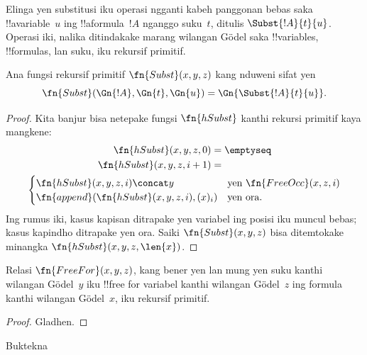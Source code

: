 \documentclass[../../../include/open-logic-section]{subfiles}
\begin{document}

Elinga yen substitusi iku operasi ngganti kabeh panggonan bebas
saka !!a{variable}~$u$ ing !!a{formula}~$!A$ nganggo suku~$t$,
ditulis $\Subst{!A}{t}{u}$. Operasi iki, nalika ditindakake marang
wilangan G\"odel saka !!{variable}s, !!{formula}s, lan suku,
iku rekursif primitif.

\begin{prop}
Ana fungsi rekursif primitif $\fn{Subst}(x, y, z)$ kang nduweni
sifat yen
\[
\fn{Subst}(\Gn{!A}, \Gn{t}, \Gn{u}) = \Gn{\Subst{!A}{t}{u}}.
\]
\end{prop}

\begin{proof}
Kita banjur bisa netepake fungsi $\fn{hSubst}$ kanthi rekursi
primitif kaya mangkene:
\begin{multline*}
\begin{aligned}
\fn{hSubst}(x, y, z, 0) & = \emptyseq \\
\fn{hSubst}(x, y, z, i+1) & =
\end{aligned}\\
\begin{cases}
\fn{hSubst}(x, y, z, i) \concat y & \text{yen $\fn{FreeOcc}(x, z, i)$} \\
\fn{append}(\fn{hSubst}(x, y, z, i), (x)_{i}) & \text{yen ora.}
\end{cases}
\end{multline*} Ing rumus iki, kasus kapisan ditrapake yen variabel ing posisi iku muncul bebas; kasus kapindho ditrapake yen ora.
Saiki $\fn{Subst}(x, y, z)$ bisa ditemtokake minangka
$\fn{hSubst}(x, y, z, \len{x})$.
\end{proof}

\begin{prop}
Relasi $\fn{FreeFor}(x, y, z)$, kang bener yen lan mung yen suku
kanthi wilangan G\"odel~$y$ iku !!{free for} variabel kanthi
wilangan G\"odel~$z$ ing formula kanthi wilangan G\"odel~$x$,
iku rekursif primitif.
\end{prop}

\begin{proof} Gladhen. \end{proof}

\begin{prob}
Buktekna 
\end{prob}
\end{document}
